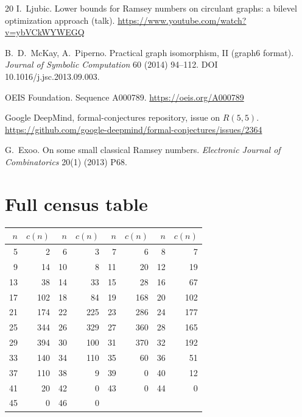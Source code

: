 \documentclass[11pt]{article}
\theoremstyle{remark}
\begin{document}
\begin{thebibliography}{20}
 I.~Ljubic. Lower bounds for Ramsey numbers on circulant graphs:
a bilevel optimization approach (talk). \url{https://www.youtube.com/watch?v=ybVCkWYWEGQ}

 B.~D.~McKay, A.~Piperno. Practical graph isomorphism, II
(graph6 format). \emph{Journal of Symbolic Computation} 60 (2014) 94--112.
DOI 10.1016/j.jsc.2013.09.003.

 OEIS Foundation. Sequence A000789.
\url{https://oeis.org/A000789}

 Google DeepMind, formal-conjectures repository, issue on
$R(5,5)$. \url{https://github.com/google-deepmind/formal-conjectures/issues/2364}

 G.~Exoo. On some small classical Ramsey numbers.
\emph{Electronic Journal of Combinatorics} 20(1) (2013) P68.

\end{thebibliography}

\appendix
\section{Full census table}\label{app:table}
\begin{center}\small\ttfamily
\begin{tabular}{rr|rr|rr|rr}
\toprule
$n$ & $c(n)$ & $n$ & $c(n)$ & $n$ & $c(n)$ & $n$ & $c(n)$\\
\midrule
5 & 2 & 6 & 3 & 7 & 6 & 8 & 7 \\
9 & 14 & 10 & 8 & 11 & 20 & 12 & 19 \\
13 & 38 & 14 & 33 & 15 & 28 & 16 & 67 \\
17 & 102 & 18 & 84 & 19 & 168 & 20 & 102 \\
21 & 174 & 22 & 225 & 23 & 286 & 24 & 177 \\
25 & 344 & 26 & 329 & 27 & 360 & 28 & 165 \\
29 & 394 & 30 & 100 & 31 & 370 & 32 & 192 \\
33 & 140 & 34 & 110 & 35 & 60 & 36 & 51 \\
37 & 110 & 38 & 9 & 39 & 0 & 40 & 12 \\
41 & 20 & 42 & 0 & 43 & 0 & 44 & 0 \\
45 & 0 & 46 & 0 \\
\bottomrule
\end{tabular}\end{center}
\end{document}

